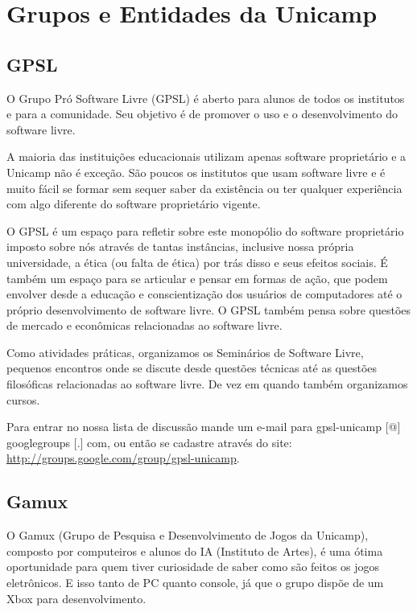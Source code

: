
\section{Grupos e Entidades da Unicamp}
\subsection{GPSL}

O Grupo Pró Software Livre (GPSL) é aberto para alunos de todos os institutos
e para a comunidade. Seu objetivo é de promover o uso e o desenvolvimento do
software livre.

A maioria das instituições educacionais utilizam apenas software
proprietário e a Unicamp não é exceção. São poucos os institutos que usam
software livre e é muito fácil se formar sem sequer saber da existência ou ter
qualquer experiência com algo diferente do software proprietário vigente.

O GPSL é um espaço para refletir sobre este monopólio do software proprietário
imposto sobre nós através de tantas instâncias, inclusive nossa própria
universidade, a ética (ou falta de ética) por trás disso e seus efeitos sociais.
É também um espaço para se articular e pensar em formas de ação, que podem
envolver desde a educação e conscientização dos usuários de computadores até
o próprio desenvolvimento de software livre. O GPSL também pensa sobre
questões de mercado e econômicas relacionadas ao software livre.

Como atividades práticas, organizamos os Seminários de Software Livre, pequenos
encontros onde se discute desde questões técnicas até as questões filosóficas
relacionadas ao software livre. De vez em quando também organizamos cursos.

Para entrar no nossa lista de discussão mande um e-mail para gpsl-unicamp [@]
googlegroups [.] com, ou então se cadastre através do site:
\url{http://groups.google.com/group/gpsl-unicamp}.

\subsection{Gamux}

O Gamux (Grupo de Pesquisa e Desenvolvimento de Jogos da Unicamp), composto por
computeiros e alunos do IA (Instituto de Artes), é uma ótima oportunidade para
quem tiver curiosidade de saber como são feitos os jogos eletrônicos. E isso
tanto de PC quanto console, já que o grupo dispõe de um Xbox para
desenvolvimento.

